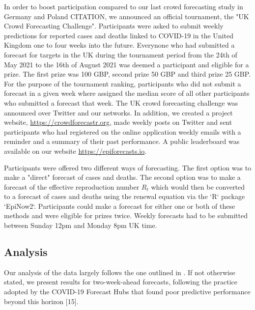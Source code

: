 \documentclass[10pt,a4paper,twocolumn]{article}
\begin{document}
In order to boost participation compared to our last crowd forecasting study in Germany and Poland CITATION, we announced an official tournament, the "UK Crowd Forecasting Challenge". Participants were asked to submit weekly predictions for reported cases and deaths linked to COVID-19 in the United Kingdom one to four weeks into the future. Everynone who had submitted a forecast for targets in the UK during the tournament period from the 24th of May 2021 to the 16th of August 2021 was deemed a participant and eligible for a prize. The first prize was 100 GBP, second prize 50 GBP and third prize 25 GBP. For the purpose of the tournament ranking, participants who did not submit a forecast in a given week where assigned the median score of all other participants who submitted a forecast that week. The UK crowd forecasting challenge was announced over Twitter and our networks. 
In addition, we created a project website, \url{https://crowdforecastr.org}, made weekly posts on Twitter and sent participants who had registered on the online application weekly emails with a reminder and a summary of their past performance. A public leaderboard was available on our website \url{https://epiforecasts.io}.

Participants were offered two different ways of forecasting. The first option was to make a "direct" forecast of cases and deaths. The second option was to make a forecast of the effective reproduction number $R_t$ which would then be converted to a forecast of cases and deaths using the renewal equation \citep{fraserEstimatingIndividualHousehold2007} via the `R` \citep{R} package `EpiNow2`. Participants could make a forecast for either one or both of these methods and were eligible for prizes twice. Weekly forecasts had to be submitted between Sunday 12pm and Monday 8pm UK time. 


\subsection{Analysis}

Our analysis of the data largely follows the one outlined in \cite{bosseComparingHumanModelbased2022}. If not otherwise stated, we present results for two-week-ahead forecasts, following the practice adopted by the COVID-19 Forecast Hubs that found poor predictive performance beyond this horizon [15]. 
\end{document}
